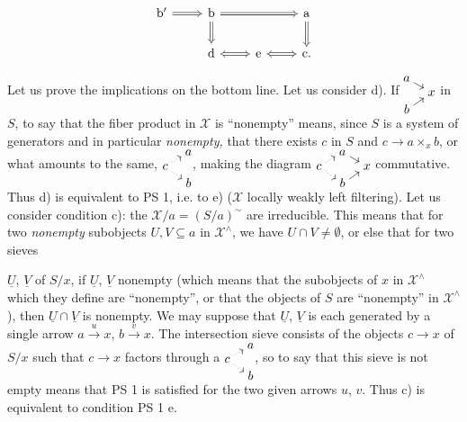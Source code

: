 \documentclass[11pt]{article}
\newcommand{\printedpage}[1]{\marginpar{\footnotesize p.~#1}}
\newcommand{\msp}[1]{\marginpar{\footnotesize [#1]}}
\newcommand{\X}{\mathcal{X}}
\begin{document}
\printedpage{14}

\[
\begin{tikzcd}
\mathrm{b}' \arrow[r, Rightarrow] & \mathrm{b} \arrow[rr, Rightarrow] \arrow[d, Rightarrow] & & \mathrm{a} \arrow[d, Rightarrow] \\
 & \mathrm{d} \arrow[r, Leftrightarrow] & \mathrm{e} \arrow[r, Leftrightarrow] & \mathrm{c}.
\end{tikzcd}
\]

Let us prove the implications on the bottom line. Let us consider d). If $\begin{tikzcd}[cramped, row sep=0.1em, column sep=0.8em, baseline=(current bounding box.center)] a \arrow[dr] & \\ & x \\ b \arrow[ur] & \end{tikzcd}$ in $S$, to say that the fiber product in $\X$ is ``nonempty'' means, since $S$ is a system of generators and in particular \textit{nonempty,} that there exists $c$ in $S$ and $c\longrightarrow a\times_x b$, or what amounts to the same, $\begin{tikzcd}[cramped, row sep=0.1em, column sep=0.8em, baseline=(current bounding box.center)] & a \\ c \arrow[ur, dotted] \arrow[dr, dotted] & \\ & b \end{tikzcd}$, making the diagram $\begin{tikzcd}[cramped, row sep=0.1em, column sep=0.8em, baseline=(current bounding box.center)] & a \arrow[dr] & \\ c \arrow[ur, dotted] \arrow[dr, dotted] & & x \\ & b \arrow[ur] & \end{tikzcd}$ commutative. Thus d) is equivalent to PS 1, i.e. to e) ($\X$ locally weakly left filtering). Let us consider condition c): the $\X/a=(S/a)^\sim$ are irreducible. This means that for two \textit{nonempty} subobjects $U,V\subseteq a$ in $\X^\wedge$, we have $U\cap V\neq\emptyset$, or else that for two sieves

\msp{page 22}$\underline{U}$, $\underline{V}$ of $S/x$, if $\underline{U}$, $\underline{V}$ nonempty (which means that the subobjects of $x$ in $\X^\wedge$ which they define are ``nonempty'', or that the objects of $S$ are ``nonempty'' in $\X^\wedge$), then $\underline{U}\cap\underline{V}$ is nonempty. We may suppose that $\underline{U}$, $\underline{V}$ is each generated by a single arrow $a\xrightarrow{u}x$, $b\xrightarrow{v}x$. The intersection sieve consists of the objects $c\longrightarrow x$ of $S/x$ such that $c\longrightarrow x$ factors through a $\begin{tikzcd}[cramped, row sep=0.1em, column sep=0.8em, baseline=(current bounding box.center)] & a \\ c \arrow[ur, dotted] \arrow[dr, dotted] & \\ & b \end{tikzcd}$, so to say that this sieve is not empty means that PS 1 is satisfied for the two given arrows $u$, $v$. Thus c) is equivalent to condition PS 1 e.
\end{document}
